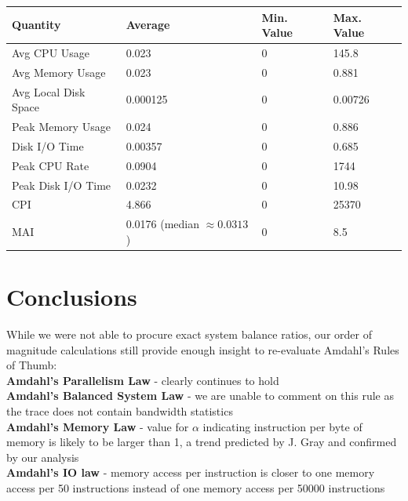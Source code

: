 \documentclass[a0,portrait]{a0poster}
\begin{document}
\begin{multicols}{2}
\begin{center}\vspace{1cm}
\begin{tabular}{| l | l l l |} 
\toprule
\textbf{Quantity} & \textbf{Average} & \textbf{Min. Value} & \textbf{Max. Value} \\
\midrule
Avg CPU Usage & 0.023 & 0 & 145.8 \\ \hline
Avg Memory Usage & 0.023 & 0 & 0.881 \\ \hline
Avg Local Disk Space & 0.000125 & 0 & 0.00726 \\ \hline
Peak Memory Usage & 0.024 & 0 & 0.886 \\ \hline
Disk I/O Time & 0.00357 & 0 & 0.685 \\ \hline
Peak CPU Rate & 0.0904 & 0 & 1744\* \\ \hline
Peak Disk I/O Time & 0.0232 & 0 & 10.98 \\ \hline
CPI & 4.866 & 0 & 25370\* \\ \hline
MAI & 0.0176 (median $\approx 0.0313$) & 0 & 8.5\* \\ \hline
\bottomrule
\end{tabular}
\end{center}\vspace{1cm}



\color{SaddleBrown} %

\section*{Conclusions}

While we were not able to procure exact system balance ratios, our order of magnitude calculations still provide enough insight to re-evaluate Amdahl's Rules of Thumb: \\

\noindent \textbf{Amdahl's Parallelism Law} - clearly continues to hold \\
\textbf{Amdahl's Balanced System Law} - we are unable to comment on this rule as the trace does not contain bandwidth statistics\\
\textbf{Amdahl's Memory Law} - value for $\alpha$ indicating instruction per byte of memory is likely to be larger than 1, a trend predicted by J. Gray  and confirmed by our analysis\\
\textbf{Amdahl's IO law} - memory access per instruction is closer to one memory access per 50 instructions instead of one memory access per 50000 instructions \\


\end{multicols}
\end{document}
